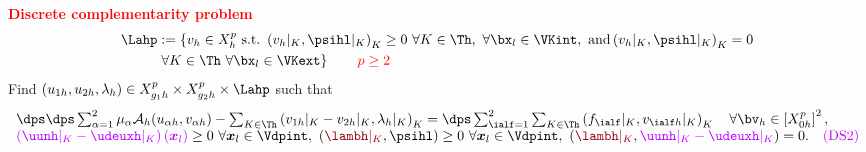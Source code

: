 \begin{frame}
  \textcolor{red}{\textbf{Discrete complementarity problem}}
  \\
    \begin{align*}
\Lahp &  := \left\{ v_h \in X_h^p \ \text{s.t.} \ \left(v_h|_{K}, \psihl|_K \right)_K \geq 0 \ \forall K \in \Th, \ \forall \bx_l \in \VKint, \ \text{and} \left(v_h|_K, \psihl|_K  \right)_K = 0 \right. \\
       & \left.  \forall K \in \Th \ \forall \bx_l \in \VKext \right\}    \qquad \textcolor{red}{p \geq 2}
  \end{align*}
Find $\left(u_{1h}, u_{2h}, \lambda_h\right) \in X_{g_1 h}^p \times X_{g_2 h}^p \times \Lahp$ such that
\begin{equation*}
\begin{array}{lcl}
\dps \dps \sum_{\alpha=1}^2 \mu_{\alpha} \mathcal{A}_h(u_{\alpha h}, v_{\alpha h}) - \sum_{K \in \Th} \left(v_{1h}|_K - v_{2h}|_K, \lambda_h|_K \right)_K 
=  \dps \sum_{\ialf=1}^2 \sum_{K \in \Th} \left(f_\ialf|_K,v_{\ialf h}|_K \right)_{K} \quad \forall \bv_h \in \left[X_{0 h}^p\right]^2, \\
\textcolor{electricpurple}{\left(\uunh|_K-\udeuxh|_K \right)(\xl)} \geq 0 \ \forall \xl \in \Vdpint, \ \left(\textcolor{carmine}{\lambh|_K}, \psihl \right) \geq 0 \ \forall \xl \in \Vdpint, \ \left( \textcolor{carmine}{\lambh|_K}, \textcolor{electricpurple}{\uunh|_K - \udeuxh|_K} \right)=0.  \quad \textcolor{electricpurple}{(\mathrm{DS}2)}
\end{array}
\end{equation*}
\end{frame}
